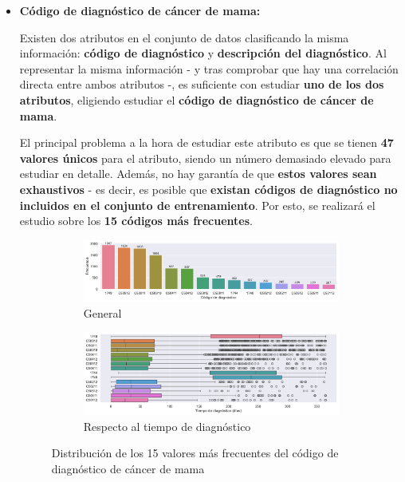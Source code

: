 \begin{itemize}[leftmargin=*]
	\item \textbf{Código de diagnóstico de cáncer de mama:}
	
	Existen dos atributos en el conjunto de datos clasificando la misma información: \textbf{código de diagnóstico} y \textbf{descripción del diagnóstico}. Al representar la misma información - y tras comprobar que hay una correlación directa entre ambos atributos -, es suficiente con estudiar \textbf{uno de los dos atributos}, eligiendo estudiar el \textbf{código de diagnóstico de cáncer de mama}.
	
	El principal problema a la hora de estudiar este atributo es que se tienen \textbf{47 valores únicos} para el atributo, siendo un número demasiado elevado para estudiar en detalle. Además, no hay garantía de que \textbf{estos valores sean exhaustivos} - es decir, es posible que \textbf{existan códigos de diagnóstico no incluidos en el conjunto de entrenamiento}. Por esto, se realizará el estudio sobre los \textbf{15 códigos más frecuentes}.
	
	\begin{figure}[h]
		\begin{center}
			\begin{subfigure}{\linewidth}
				\begin{center}
					\includegraphics[width=\linewidth]{figs/chapter3/categorical/bcdistribution}
					\caption{General}\label{fig:ch3bcdist}
				\end{center}
			\end{subfigure} 
			\begin{subfigure}{\linewidth}
				\begin{center}
					\includegraphics[width=\linewidth]{figs/chapter3/categorical/bcperiod}
					\caption{Respecto al tiempo de diagnóstico}\label{fig:ch3bcperiod}
				\end{center}
			\end{subfigure} 
		\end{center}
		\captionsetup{aboveskip=-5pt, belowskip=-15pt, justification=centering}
		\caption{Distribución de los 15 valores más frecuentes del código de diagnóstico de cáncer de mama}
		\label{fig:ch3bc}
	\end{figure}
	

\end{itemize}
